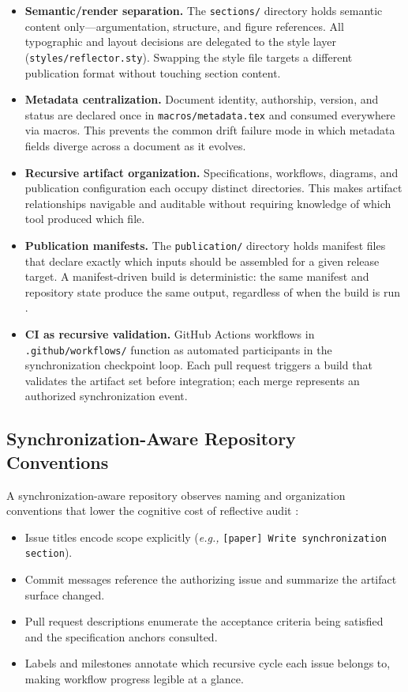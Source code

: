 \begin{itemize}
  \item \textbf{Semantic/render separation.} The \texttt{sections/} directory holds semantic content only---argumentation, structure, and figure references. All typographic and layout decisions are delegated to the style layer (\texttt{styles/reflector.sty}). Swapping the style file targets a different publication format without touching section content.

  \item \textbf{Metadata centralization.} Document identity, authorship, version, and status are declared once in \texttt{macros/metadata.tex} and consumed everywhere via macros. This prevents the common drift failure mode in which metadata fields diverge across a document as it evolves.

  \item \textbf{Recursive artifact organization.} Specifications, workflows, diagrams, and publication configuration each occupy distinct directories. This makes artifact relationships navigable and auditable without requiring knowledge of which tool produced which file.

  \item \textbf{Publication manifests.} The \texttt{publication/} directory holds manifest files that declare exactly which inputs should be assembled for a given release target. A manifest-driven build is deterministic: the same manifest and repository state produce the same output, regardless of when the build is run \cite{Vogels2009EventuallyConsistent}.

  \item \textbf{CI as recursive validation.} GitHub Actions workflows in \texttt{.github/workflows/} function as automated participants in the synchronization checkpoint loop. Each pull request triggers a build that validates the artifact set before integration; each merge represents an authorized synchronization event.
\end{itemize}

\subsection{Synchronization-Aware Repository Conventions}

A synchronization-aware repository observes naming and organization conventions that lower the cognitive cost of reflective audit \cite{Simon1957ModelsMan}:
\begin{itemize}
  \item Issue titles encode scope explicitly (\textit{e.g.,} \texttt{[paper] Write synchronization section}).
  \item Commit messages reference the authorizing issue and summarize the artifact surface changed.
  \item Pull request descriptions enumerate the acceptance criteria being satisfied and the specification anchors consulted.
  \item Labels and milestones annotate which recursive cycle each issue belongs to, making workflow progress legible at a glance.
\end{itemize}

